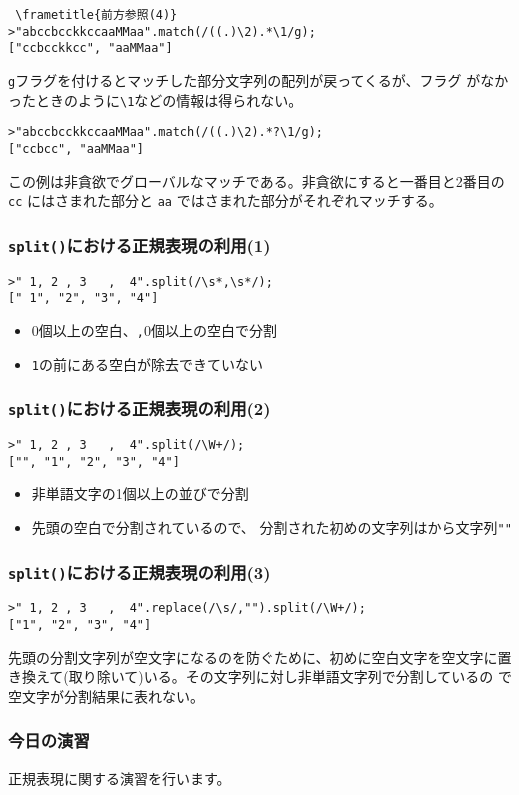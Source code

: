 \documentclass[dvipsk]{beamer}
\begin{document}
\begin{frame}[containsverbatim]
\begin{verbatim}
 \frametitle{前方参照(4)}
>"abccbcckkccaaMMaa".match(/((.)\2).*\1/g);
["ccbcckkcc", "aaMMaa"]
\end{verbatim}
\verb+g+フラグを付けるとマッチした部分文字列の配列が戻ってくるが、フラグ
 がなかったときのように\verb+\1+などの情報は得られない。
\begin{verbatim}
>"abccbcckkccaaMMaa".match(/((.)\2).*?\1/g);
["ccbcc", "aaMMaa"]
\end{verbatim}
この例は非貪欲でグローバルなマッチである。非貪欲にすると一番目と2番目の
 \verb+cc+ にはさまれた部分と \verb+aa+ ではさまれた部分がそれぞれマッチする。
\end{frame}
\iffalse\else
\begin{frame}[containsverbatim]
\frametitle{\protect\texttt{split()}における正規表現の利用(1)}
\begin{verbatim}
>" 1, 2 , 3   ,  4".split(/\s*,\s*/);
[" 1", "2", "3", "4"]
\end{verbatim}
\begin{itemize}
 \item $0$個以上の空白、\verb+,+$0$個以上の空白で分割
 \item \verb+1+の前にある空白が除去できていない
\end{itemize} 
\end{frame}
\fi
\iffalse\else
\begin{frame}[containsverbatim]
\frametitle{\protect\texttt{split()}における正規表現の利用(2)}
\begin{verbatim}
>" 1, 2 , 3   ,  4".split(/\W+/);
["", "1", "2", "3", "4"]
\end{verbatim}
\begin{itemize}
 \item 非単語文字の1個以上の並びで分割
 \item 先頭の空白で分割されているので、
 分割された初めの文字列はから文字列\verb+""+
\end{itemize}
\end{frame}
\begin{frame}[containsverbatim]
\frametitle{\protect\texttt{split()}における正規表現の利用(3)}
\begin{verbatim}
>" 1, 2 , 3   ,  4".replace(/\s/,"").split(/\W+/);
["1", "2", "3", "4"]
\end{verbatim}
先頭の分割文字列が空文字になるのを防ぐために、初めに空白文字を空文字に置
 き換えて(取り除いて)いる。その文字列に対し非単語文字列で分割しているの
 で空文字が分割結果に表れない。
\end{frame}
\fi
\begin{frame}
 \frametitle{今日の演習}
正規表現に関する演習を行います。
\end{frame}
\end{document}
